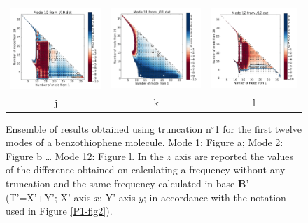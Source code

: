 \begin{figure}[H]
\begin{center}
\begin{tabular}{c c c}
				\includegraphics{image/image/P1-F341} & \includegraphics{image/image/P1-F342} & \includegraphics{image/image/P1-F343}\\
				j & k & l   \label{P1-F3}
			\end{tabular}
		\end{center}
		\caption[Ensemble of results obtained using truncation n$^{\circ}$1 for the first twelve modes of a benzothiophene molecule]{Ensemble of results obtained using truncation n$^{\circ}$1 for the first twelve modes of a benzothiophene molecule. Mode 1: Figure a; Mode 2: Figure b … Mode 12: Figure l.
			In the $z$ axis are reported the values of the difference obtained on calculating a frequency without any truncation and the same frequency calculated in base $\textbf{B’}$ (T’=X’+Y’; X’ axis $x$; Y’ axis $y$; in accordance with the notation used in Figure \ref{P1-fig2}).}  \label{P1-Fig3}
	\end{figure}
	

